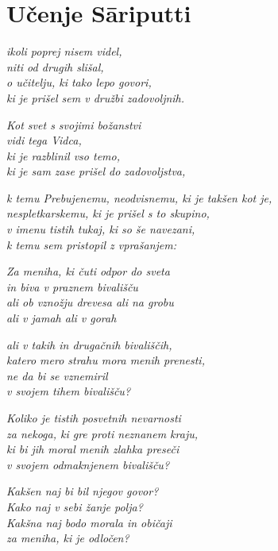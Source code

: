 \cleartorecto
{}
\chapter{Učenje Sāriputti}

\emph{ikoli poprej nisem videl,\\
niti od drugih slišal,\\
o učitelju, ki tako lepo govori,\\
ki je prišel sem v družbi zadovoljnih.}

\emph{Kot svet s svojimi božanstvi}\\
\emph{vidi tega Vidca,}\\
\emph{ki je razblinil vso temo,}\\
\emph{ki je sam zase prišel do zadovoljstva,}

\clearpage

\emph{k temu Prebujenemu, neodvisnemu, ki je takšen kot je,}\\
\emph{nespletkarskemu, ki je prišel s to skupino,}\\
\emph{v imenu tistih tukaj, ki so še navezani,}\\
\emph{k temu sem pristopil z vprašanjem:}

\emph{Za meniha, ki čuti odpor do sveta}\\
\emph{in biva v praznem bivališču}\\
\emph{ali ob vznožju drevesa ali na grobu}\\
\emph{ali v jamah ali v gorah}

\emph{ali v takih in drugačnih bivališčih,}\\
\emph{katero mero strahu mora menih prenesti,}\\
\emph{ne da bi se vznemiril}\\
\emph{v svojem tihem bivališču?}

\emph{Koliko je tistih posvetnih nevarnosti}\\
\emph{za nekoga, ki gre proti neznanem kraju,}\\
\emph{ki bi jih moral menih zlahka preseči}\\
\emph{v svojem odmaknjenem bivališču?}

\emph{Kakšen naj bi bil njegov govor?}\\
\emph{Kako naj v sebi žanje polja?}\\
\emph{Kakšna naj bodo morala in običaji}\\
\emph{za meniha, ki je odločen?}

